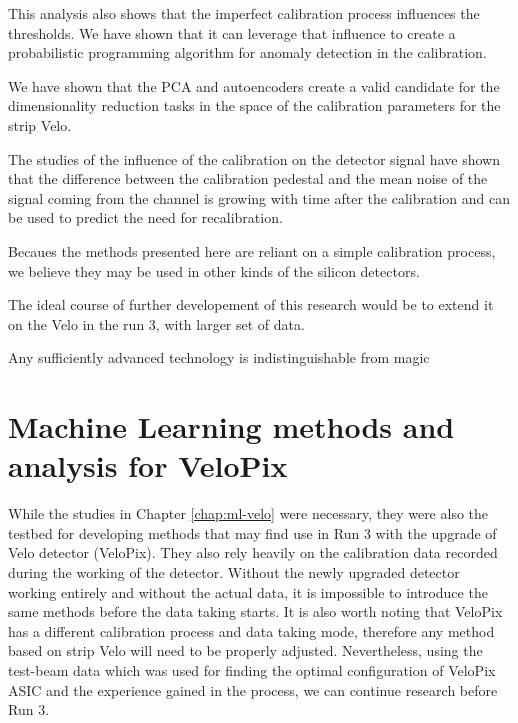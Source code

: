 This analysis also shows that the imperfect calibration process influences the thresholds. We have shown that it can leverage that influence to create a probabilistic programming algorithm for anomaly detection in the calibration.

We have shown that the PCA and autoencoders create a valid candidate for the dimensionality reduction tasks in the space of the calibration parameters for the strip Velo.

The studies of the influence of the calibration on the detector signal have shown that the difference between the calibration pedestal and the mean noise of the signal coming from the channel is growing with time after the calibration and can be used to predict the need for recalibration.

Becaues the methods presented here are reliant on a simple calibration process, we believe they may be used in other kinds of the silicon detectors.

The ideal course of further developement of this research would be to extend it on the Velo in the run 3, with larger set of data.


\begin{savequote}[75mm]
Any sufficiently advanced technology is indistinguishable from magic
\end{savequote}
\chapter{Machine Learning methods and analysis for VeloPix}
\label{chap:ml-velo-pix}

While the studies in Chapter \ref{chap:ml-velo} were necessary, they were also the testbed for developing methods that may find use in Run 3 with the upgrade of Velo detector (VeloPix).
They also rely heavily on the calibration data recorded during the working of the detector. 
Without the newly upgraded detector working entirely and without the actual data, it is impossible to introduce the same methods before the data taking starts.
It is also worth noting that VeloPix has a different calibration process and data taking mode, therefore any method based on strip Velo will need to be properly adjusted.
Nevertheless, using the test-beam data which was used for finding the optimal configuration of VeloPix ASIC and the experience gained in the process, we can continue research before Run 3.

